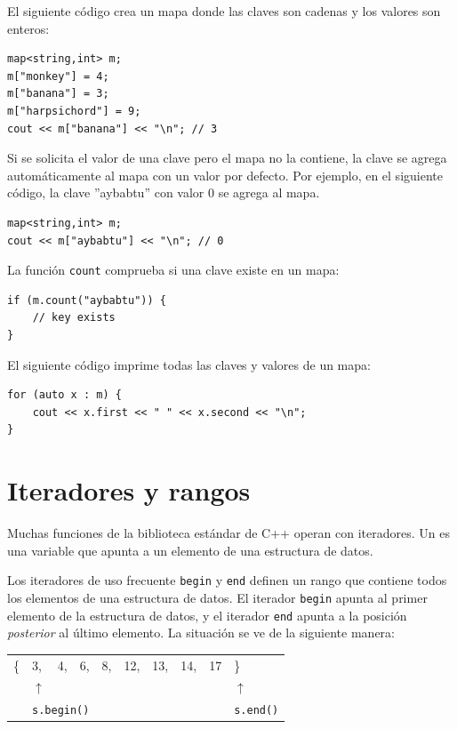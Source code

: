 El siguiente código crea un mapa
donde las claves son cadenas y los valores son enteros:

\begin{lstlisting}
map<string,int> m;
m["monkey"] = 4;
m["banana"] = 3;
m["harpsichord"] = 9;
cout << m["banana"] << "\n"; // 3
\end{lstlisting}

Si se solicita el valor de una clave
pero el mapa no la contiene,
la clave se agrega automáticamente al mapa con
un valor por defecto.
Por ejemplo, en el siguiente código,
la clave ''aybabtu'' con valor 0
se agrega al mapa.

\begin{lstlisting}
map<string,int> m;
cout << m["aybabtu"] << "\n"; // 0
\end{lstlisting}
La función \texttt{count} comprueba
si una clave existe en un mapa:
\begin{lstlisting}
if (m.count("aybabtu")) {
    // key exists
}
\end{lstlisting}
El siguiente código imprime todas las claves y valores
de un mapa:
\begin{lstlisting}
for (auto x : m) {
    cout << x.first << " " << x.second << "\n";
}
\end{lstlisting}

\section{Iteradores y rangos}


Muchas funciones de la biblioteca estándar de C++
operan con iteradores.
Un  es una variable que apunta
a un elemento de una estructura de datos.

Los iteradores de uso frecuente \texttt{begin}
y \texttt{end} definen un rango que contiene
todos los elementos de una estructura de datos.
El iterador \texttt{begin} apunta al
primer elemento de la estructura de datos,
y el iterador \texttt{end} apunta a
la posición \emph{posterior} al último elemento.
La situación se ve de la siguiente manera:

\begin{center}
\begin{tabular}{llllllllll}
\{ & 3, & 4, & 6, & 8, & 12, & 13, & 14, & 17 & \} \\
& $\uparrow$ & & & & & & & & $\uparrow$ \\
& \multicolumn{3}{l}{\texttt{s.begin()}} & & & & & & \texttt{s.end()} \\
\end{tabular}
\end{center}

